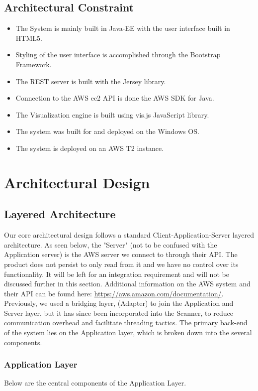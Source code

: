 \documentclass[hidelinks,a4paper,12pt]{article}
\begin{document}
\subsection{Architectural Constraint}
\begin{itemize} 
\item The System is mainly built in Java-EE with the user interface built in HTML5.
\item Styling of the user interface is accomplished through the Bootstrap Framework.
\item The REST server is built with the Jersey library.
\item Connection to the AWS ec2 API is done the AWS SDK for Java.
\item The Visualization engine is built using vis.js JavaScript library.
\item The system was built for and deployed on the Windows OS.
\item The system is deployed on an AWS T2 instance.

\end{itemize}
\newpage

\section{Architectural Design}
\subsection{Layered Architecture} 

Our core architectural design follows a standard Client-Application-Server layered architecture. As seen below, the "Server" (not to be confused with the Application server) is the AWS server we connect to through their API. The product does not persist to only read from it and we have no control over its functionality. It will be left for an integration requirement and will not be discussed further in this section. Additional information on the AWS system and their API can be found here: \url{https://aws.amazon.com/documentation/}. Previously, we used a bridging layer, (Adapter) to join the Application and Server layer, but it has since been incorporated into the Scanner, to reduce communication overhead and facilitate threading tactics. The primary back-end of the system lies on the Application layer, which is broken down into the several components.
\subsubsection{Application Layer}
Below are the central components of the Application Layer.
\end{document}
